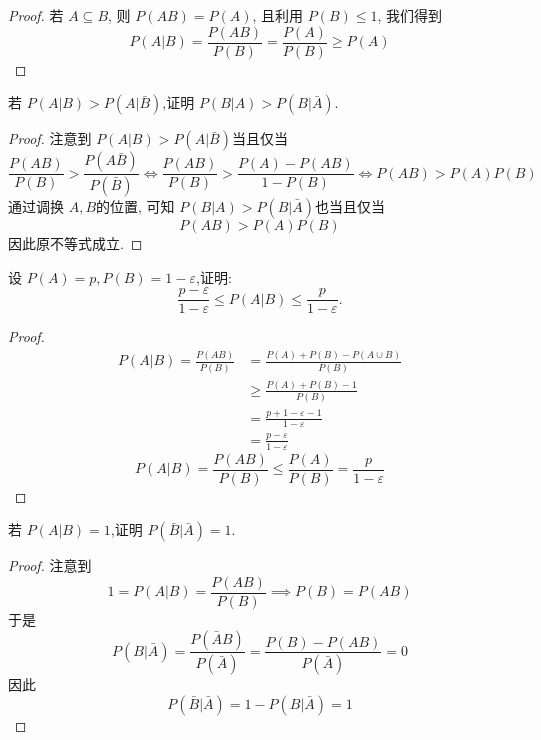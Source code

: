 \documentclass[../main.tex]{subfiles}
\begin{document}
\begin{proof}
    若 \(  A\subseteq B  \), 则 \(  P\left( AB \right)= P\left( A \right)    \), 且利用 \(  P\left( B \right)\le 1   \),  我们得到 \[
    P\left( A|B \right)= \frac{P\left( AB \right)  }{P\left( B \right)  }= \frac{P\left( A \right)  }{P\left( B \right)  }  \ge P\left( A \right)  
    \]  
\end{proof}
\begin{exercise}{}{}
若 $P(A|B)>P(A|\bar{B})$,证明 $P(B|A)>P(B|\bar{A})$.
\end{exercise}

\begin{proof}
    注意到 \(  P\left( A|B \right)> P\left( A| \bar{B} \right)    \)当且仅当 \[
    \frac{P\left(  AB \right)  }{P\left( B \right)  }> \frac{P\left( A \bar{B} \right)  }{P\left( \bar{B} \right)  } \iff  \frac{P\left( AB \right)  }{P\left( B \right)  }> \frac{P\left( A \right)-P\left( AB \right)   }{1-P\left( B \right)  }\iff P\left( AB \right)> P\left( A \right)P\left( B \right)      
    \]通过调换 \(  A,B  \)的位置, 可知 \(  P\left( B|A \right)> P\left( B|\bar{A} \right)    \)也当且仅当 \[
    P\left( AB \right)> P\left( A \right)P\left( B \right)   
    \]  因此原不等式成立.
\end{proof}

\begin{exercise}{}{}
设 $P(A)=p, P(B)=1-\varepsilon$,证明:
\[ \frac{p-\varepsilon}{1-\varepsilon} \le P(A|B) \le \frac{p}{1-\varepsilon}. \]
\end{exercise}

\begin{proof}
    \[
   \begin{aligned}
    P\left( A|B \right)= \frac{P\left( AB \right)  }{P\left( B \right)  }&= \frac{P\left( A \right)+ P\left( B \right)-P\left( A\cup B \right)      }{ P\left( B \right) }\\ 
     &\ge \frac{P\left( A \right)+ P\left( B \right)-1  }{P\left( B \right)  }\\ 
      &= \frac{p+ 1- \varepsilon -1  }{1- \varepsilon  }\\ 
       &= \frac{p- \varepsilon  }{1- \varepsilon  }  
   \end{aligned}    
    \]  \[
    P\left( A|B \right)= \frac{P\left( AB \right)  }{P\left( B \right)  }\le \frac{P\left( A \right)  }{P\left( B \right)  }= \frac{p }{1- \varepsilon  }    
    \]
\end{proof}

\begin{exercise}{}{}
若 $P(A|B)=1$,证明 $P(\bar{B}|\bar{A})=1$.
\end{exercise}
\begin{proof}
   注意到  \[
     1= P\left( A|B \right)= \frac{P\left( AB \right)  }{P\left( B \right)  }\implies P\left( B \right)= P\left( AB \right)     
     \]于是 \[
     P\left( B|\bar{A} \right)= \frac{P\left( \bar{A}B \right)  }{P\left( \bar{A} \right)  }= \frac{P\left( B \right)-P\left( AB \right)   }{P\left( \bar{A} \right)  }= 0   
     \]因此 \[
     P\left( \bar{B}|\bar{A} \right) =1- P\left( B|\bar{A} \right) = 1
     \]
\end{proof}
\end{document}
